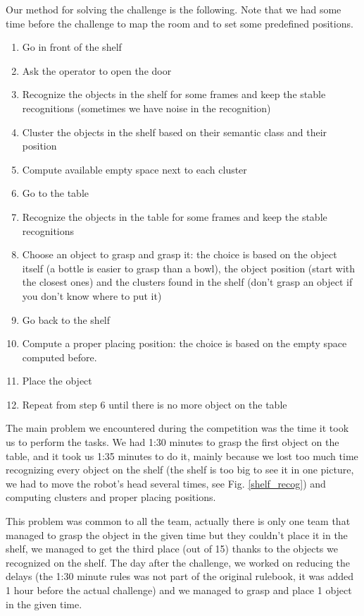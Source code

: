 \documentclass[a4paper, twocolumn]{article}
\begin{document}
    Our method for solving the challenge is the following. Note that we had some time before the challenge to map the room and to set some predefined positions.
    \begin{enumerate}
        \item Go in front of the shelf
        \item Ask the operator to open the door
        \item Recognize the objects in the shelf for some frames and keep the stable recognitions (sometimes we have noise in the recognition)
        \item Cluster the objects in the shelf based on their semantic class and their position
        \item Compute available empty space next to each cluster
        \item Go to the table
        \item Recognize the objects in the table for some frames and keep the stable recognitions
        \item Choose an object to grasp and grasp it: the choice is based on the object itself (a bottle is easier to grasp than a bowl), the object position (start with the closest ones) and the clusters found in the shelf (don't grasp an object if you don't know where to put it)
        \item Go back to the shelf
        \item Compute a proper placing position: the choice is based on the empty space computed before.
        \item Place the object
        \item Repeat from step 6 until there is no more object on the table
    \end{enumerate}

    The main problem we encountered during the competition was the time it took us to perform the tasks. We had 1:30 minutes to grasp the first object on the table, and it took us 1:35 minutes to do it, mainly because we lost too much time recognizing every object on the shelf (the shelf is too big to see it in one picture, we had to move the robot's head several times, see Fig. \ref{shelf_recog}) and computing clusters and proper placing positions.

    This problem was common to all the team, actually there is only one team that managed to grasp the object in the given time but they couldn't place it in the shelf, we managed to get the third place (out of 15) thanks to the objects we recognized on the shelf. The day after the challenge, we worked on reducing the delays (the 1:30 minute rules was not part of the original rulebook, it was added 1 hour before the actual challenge) and we managed to grasp and place 1 object in the given time.
\end{document}
